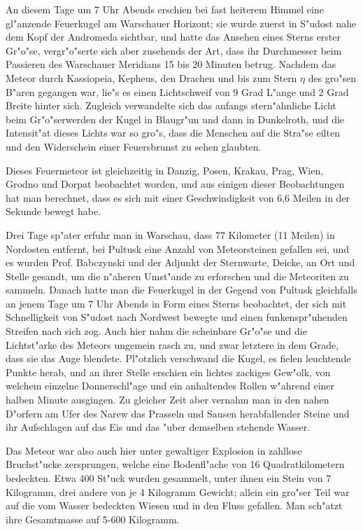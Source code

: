 \documentclass[a4paper, 11pt, oneside, german]{article}
\begin{document}
An diesem Tage um 7 Uhr Abends erschien bei fast heiterem Himmel eine gl"anzende Feuerkugel am Warschauer Horizont; sie wurde zuerst in S"udost nahe dem Kopf der Andromeda sichtbar, und hatte das Ansehen eines Sterns erster Gr"o"se, vergr"o"serte sich aber zusehends der Art, dass ihr Durchmesser beim Passieren des Warschauer Meridians 15 bis 20 Minuten betrug. Nachdem das Meteor durch Kassiopeia, Kepheus, den Drachen und bis zum Stern $\eta$ des gro"sen B"aren gegangen war, lie"s es einen Lichtschweif von 9 Grad L"ange und 2 Grad Breite hinter sich. Zugleich verwandelte sich das anfangs stern"ahnliche Licht beim Gr"o"serwerden der Kugel in Blaugr"un und dann in Dunkelroth, und die Intensit"at dieses Lichts war so gro"s, dass die Menschen auf die Stra"se eilten und den Widerschein einer Feuersbrunst zu sehen glaubten.

Dieses Feuermeteor ist gleichzeitig in Danzig, Posen, Krakau, Prag, Wien, Grodno und Dorpat beobachtet worden, und aus einigen dieser Beobachtungen hat man berechnet, dass es sich mit einer Geschwindigkeit von 6,6 Meilen in der Sekunde bewegt habe.

Drei Tage sp"ater erfuhr man in Warschau, dass 77 Kilometer (11 Meilen) in Nordosten entfernt, bei Pultusk eine Anzahl von Meteorsteinen gefallen sei, und es wurden Prof. Babczynski und der Adjunkt der Sternwarte, Deicke, an Ort und Stelle gesandt, um die n"aheren Umst"ande zu erforschen und die Meteoriten zu sammeln. Danach hatte man die Feuerkugel in der Gegend von Pultusk gleichfalls an jenem Tage um 7 Uhr Abends in Form eines Sterns beobachtet, der sich mit Schnelligkeit von S"udost nach Nordwest bewegte und einen funkenspr"uhenden Streifen nach sich zog. Auch hier nahm die scheinbare Gr"o"se und die Lichtst"arke des Meteors ungemein rasch zu, und zwar letztere in dem Grade, dass sie das Auge blendete. Pl"otzlich verschwand die Kugel, es fielen leuchtende Punkte herab, und an ihrer Stelle erschien ein lichtes zackiges Gew"olk, von welchem einzelne Donnerschl"age und ein anhaltendes Rollen w"ahrend einer halben Minute ausgingen. Zu gleicher Zeit aber vernahm man in den nahen D"orfern am Ufer des Narew das Prasseln und Sausen herabfallender Steine und ihr Aufschlagen auf das Eis und das "uber demselben stehende Wasser.

Das Meteor war also auch hier unter gewaltiger Explosion in zahllose Bruchst"ucke zersprungen, welche eine Bodenfl"ache von 16 Quadratkilometern bedeckten. Etwa 400 St"uck wurden gesammelt, unter ihnen ein Stein von 7 Kilogramm, drei andere von je 4 Kilogramm Gewicht; allein ein gro"ser Teil war auf die vom Wasser bedeckten Wiesen und in den Fluss gefallen. Man sch"atzt ihre Gesamtmasse auf 5-600 Kilogramm.
\end{document}
